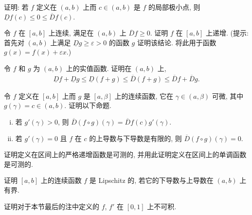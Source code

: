 \documentclass[../../main.tex]{subfiles}
\begin{document}
\begin{exercise}\label{exercise:ch06-18}
证明: 若 $f$ 定义在 $(a,b)$ 上而 $c\in(a,b)$ 是 $f$ 的局部极小点, 则 $\underline{D}f(c)\leqslant 0\leqslant\overline{D}f(c)$.
\end{exercise}

\begin{exercise}\label{exercise:ch06-19}
令 $f$ 在 $[a,b]$ 上连续, 满足在 $(a,b)$ 上 $\overline{D}f\geqslant 0$. 证明 $f$ 在 $[a,b]$ 上递增. (提示: 首先对 $(a,b)$ 上满足 $\underline{D}g\geqslant\varepsilon>0$ 的函数 $g$ 证明该结论. 将此用于函数 $g(x)=f(x)+\varepsilon x$.)
\end{exercise}

\begin{exercise}\label{exercise:ch06-20}
令 $f$ 和 $g$ 为 $(a,b)$ 上的实值函数. 证明在 $(a,b)$ 上,
\begin{align*}
\underline{D}f+\underline{D}g\leqslant\underline{D}(f+g)\leqslant\overline{D}(f+g)\leqslant\overline{D}f+\overline{D}g.
\end{align*}
\end{exercise}

\begin{exercise}\label{exercise:ch06-21}
令 $f$ 定义在 $[a,b]$ 上而 $g$ 是 $[a,\beta]$ 上的连续函数, 它在 $\gamma\in(a,\beta)$ 可微, 其中 $g(\gamma)=c\in(a,b)$. 证明以下命题.
\begin{enumerate}[(i)]
\item 若 $g'(\gamma)>0$, 则 $\overline{D}(f\circ g)(\gamma)=\overline{D}f(c)g'(\gamma)$.
\item 若 $g'(\gamma)=0$ 且 $f$ 在 $c$ 的上导数与下导数是有限的, 则 $\overline{D}(f\circ g)(\gamma)=0$.
\end{enumerate}
\end{exercise}

\begin{exercise}\label{exercise:ch06-22}
证明定义在区间上的严格递增函数是可测的, 并用此证明定义在区间上的单调函数是可测的.
\end{exercise}

\begin{exercise}\label{exercise:ch06-23}
证明 $[a,b]$ 上的连续函数 $f$ 是 Lipschitz 的, 若它的下导数与上导数在 $(a,b)$ 上有界.
\end{exercise}

\begin{exercise}\label{exercise:ch06-24}
证明对于本节最后的注中定义的 $f$, $f'$ 在 $[0,1]$ 上不可积.
\end{exercise}
\end{document}
